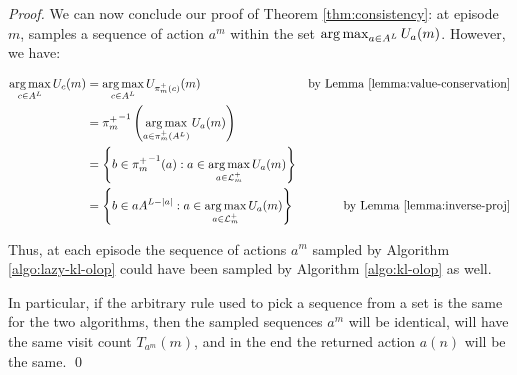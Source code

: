 \documentclass[runningheads, envcountsame, a4paper]{llncs}
\begin{document}
\begin{proof}
We can now conclude our proof of Theorem \ref{thm:consistency}: at episode $m$, \KLOLOP samples a sequence of action $a^m$ within the set $\operatorname*{arg\,max}_{a\in A^L} U_a(m)$. 
However, we have:

\begin{align*}
    \operatorname*{arg\,max}_{c\in A^L} U_c(m) &= \operatorname*{arg\,max}_{c\in A^L} U_{\pi_m^+(c)}(m) & \text{by Lemma \ref{lemma:value-conservation}} \\
    &= {\pi_m^+}^{-1}\left(\operatorname*{arg\,max}_{a\in {\pi_m^+}(A^L)} U_{a}(m)\right) & \\
    &= \left\{b\in{\pi_m^+}^{-1}(a) : a\in \operatorname*{arg\,max}_{a\in \mathcal{L}_m^+} U_{a}(m)\right\} & \\
    &= \left\{b\in a A^{L-|a|} : a\in \operatorname*{arg\,max}_{a\in \mathcal{L}_m^+} U_{a}(m)\right\} & \text{by Lemma \ref{lemma:inverse-proj}} 
\end{align*}

Thus, at each episode the sequence of actions $a^m$ sampled by Algorithm \ref{algo:lazy-kl-olop} could have been sampled by Algorithm \ref{algo:kl-olop} as well.

In particular, if the arbitrary rule used to pick a sequence from a set is the same for the two algorithms, then the sampled sequences $a^m$ will be identical, will have the same visit count $T_{a^m}(m)$, and in the end the returned action $a(n)$ will be the same.
\qed
\end{proof}
\end{document}
